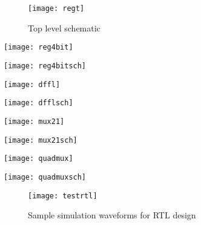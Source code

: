 \begin{figure}[ht]
  \centering
  \texttt{[image: regt]}
  \caption{Top level schematic}
  \label{fig:regt}
\end{figure} 


	\begin{center}
	\texttt{[image: reg4bit]}
	\end{center}
\vspace{10mm}
	\begin{center}
	\texttt{[image: reg4bitsch]}
	\end{center}
\pagebreak
{}
	\begin{center}
	\texttt{[image: dffl]}
	\end{center}

	\begin{center}
	\texttt{[image: dfflsch]}
	\end{center}
	\begin{center}
	\texttt{[image: mux21]}
	\end{center}
	\begin{center}
	\texttt{[image: mux21sch]}
	\end{center}
	\begin{center}
	\texttt{[image: quadmux]}
	\end{center}
	\begin{center}
	\texttt{[image: quadmuxsch]}
	\end{center}

\begin{figure}[ht]
  \centering
  \texttt{[image: testrtl]}
  \caption{Sample simulation waveforms for RTL design}
  \label{fig:testrtl}
\end{figure} 

